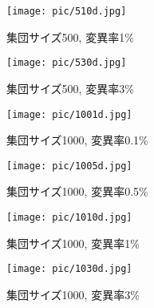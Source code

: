 \documentclass[a4j]{jarticle}
\begin{document}
\begin{figure}[htb]
 \begin{minipage}{0.5\hsize}
  \begin{center}
  \texttt{[image: pic/510d.jpg]}
  \end{center}
  \caption{集団サイズ500, 変異率1\%}
  \label{510d}
 \end{minipage}
 \begin{minipage}{0.5\hsize}
  \begin{center}
  \texttt{[image: pic/530d.jpg]}
  \end{center}
  \caption{集団サイズ500, 変異率3\%}
  \label{530d}
 \end{minipage}
\end{figure}

\begin{figure}[htb]
 \begin{minipage}{0.5\hsize}
  \begin{center}
  \texttt{[image: pic/1001d.jpg]}
  \end{center}
  \caption{集団サイズ1000, 変異率0.1\%}
  \label{1001d}
 \end{minipage}
 \begin{minipage}{0.5\hsize}
  \begin{center}
  \texttt{[image: pic/1005d.jpg]}
  \end{center}
  \caption{集団サイズ1000, 変異率0.5\%}
  \label{1005d}
 \end{minipage}
\end{figure}

\begin{figure}[htb]
 \begin{minipage}{0.5\hsize}
  \begin{center}
  \texttt{[image: pic/1010d.jpg]}
  \end{center}
  \caption{集団サイズ1000, 変異率1\%}
  \label{1010d}
 \end{minipage}
 \begin{minipage}{0.5\hsize}
  \begin{center}
  \texttt{[image: pic/1030d.jpg]}
  \end{center}
  \caption{集団サイズ1000, 変異率3\%}
  \label{1030d}
 \end{minipage}
\end{figure}
\end{document}
